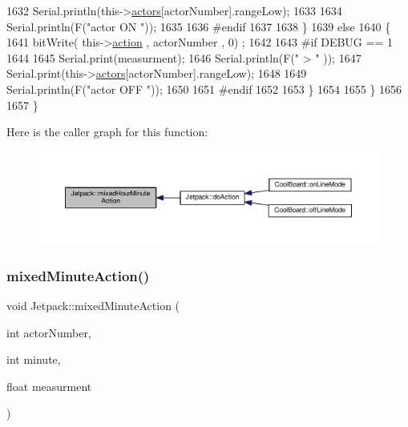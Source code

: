 \begin{DoxyCode}
1632             Serial.println(this->\hyperlink{class_jetpack_a7e16d2f97837f9712a2e6de1c50d99db}{actors}[actorNumber].rangeLow);
1633 
1634             Serial.println(F(\textcolor{stringliteral}{"actor ON "}));
1635 
1636 \textcolor{preprocessor}{        #endif  }
1637 
1638         \}
1639         \textcolor{keywordflow}{else} 
1640         \{
1641             bitWrite( this->\hyperlink{class_jetpack_aca3142925a7b0834b34ae91d26af7765}{action} , actorNumber , 0) ;
1642 
1643 \textcolor{preprocessor}{        #if DEBUG == 1 }
1644 
1645             Serial.print(measurment);
1646             Serial.println(F(\textcolor{stringliteral}{" > "} ));
1647             Serial.print(this->\hyperlink{class_jetpack_a7e16d2f97837f9712a2e6de1c50d99db}{actors}[actorNumber].rangeLow);
1648 
1649             Serial.println(F(\textcolor{stringliteral}{"actor OFF "}));
1650 
1651 \textcolor{preprocessor}{        #endif  }
1652             
1653         \}
1654     
1655     \}
1656 
1657 \}
\end{DoxyCode}
Here is the caller graph for this function\+:\nopagebreak
\begin{figure}[H]
\begin{center}
\leavevmode
\includegraphics[width=350pt]{df/d1d/class_jetpack_a273dae1517b56f0242e28b8944edc26b_icgraph}
\end{center}
\end{figure}
\mbox{\label{class_jetpack_acf8ed1fb594b9e8e224f4ed872a8e093}} 
\subsubsection{\texorpdfstring{mixed\+Minute\+Action()}{mixedMinuteAction()}}
{\footnotesize\ttfamily void Jetpack\+::mixed\+Minute\+Action (\begin{DoxyParamCaption}\item[{int}]{actor\+Number,  }\item[{int}]{minute,  }\item[{float}]{measurment }\end{DoxyParamCaption})}

